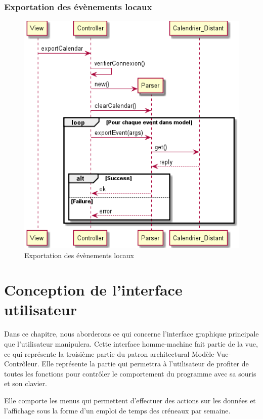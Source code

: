 {		\subsection{Exportation des évènements locaux}
			\begin{figure}[!h]
				\centering
				\includegraphics[scale=0.65]{diagseq_exportEvent.png}
				\caption{Exportation des évènements locaux}
			\end{figure}
			\FloatBarrier

\chapter{Conception de l'interface utilisateur}
    Dans ce chapitre, nous aborderons ce qui concerne l'interface graphique principale que l'utilisateur manipulera. Cette interface homme-machine fait partie de la vue, ce qui représente la troisième partie du patron architectural Modèle-Vue-Contrôleur. Elle représente la partie qui permettra à l'utilisateur de profiter de toutes les fonctions pour contrôler le comportement du programme avec sa souris et son clavier.
    
    Elle comporte les menus qui permettent d'effectuer des actions sur les données et l'affichage sous la forme d'un emploi de temps des créneaux par semaine.

}
